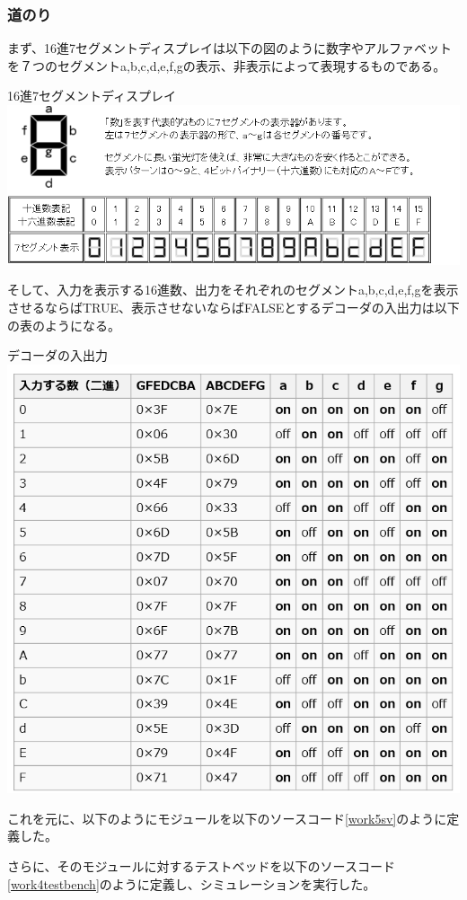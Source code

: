 \documentclass[a4paper]{jarticle}
\begin{document}
\subsubsection{道のり}
まず、16進7セグメントディスプレイは以下の図のように数字やアルファベットを７つのセグメントa,b,c,d,e,f,gの表示、非表示によって表現するものである。
\begin{center}
	16進7セグメントディスプレイ
	\includegraphics[width=15cm]{5-2.PNG}
\end{center}
そして、入力を表示する16進数、出力をそれぞれのセグメントa,b,c,d,e,f,gを表示させるならばTRUE、表示させないならばFALSEとするデコーダの入出力は以下の表のようになる。
\begin{center}
	デコーダの入出力
	\includegraphics[width=15cm]{5-1.PNG}
\end{center}
これを元に、以下のようにモジュールを以下のソースコード\ref{work5sv}のように定義した。

さらに、そのモジュールに対するテストベッドを以下のソースコード\ref{work4testbench}のように定義し、シミュレーションを実行した。

\end{document}
